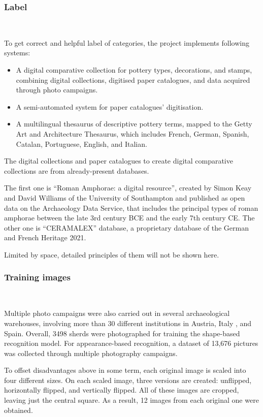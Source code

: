 \documentclass[journal]{IEEEtran}
\begin{document}
	\subsubsection{Label}
	\ 
	
	To get correct and helpful label of categories, the project implements following systems:
	
	\begin{itemize}
		\item A digital comparative collection for pottery types, decorations, and stamps, combining digital collections, digitised paper catalogues, and data acquired through photo campaigns.
		\item A semi-automated system for paper catalogues’ digitisation.
		\item A multilingual thesaurus of descriptive pottery terms, mapped to the Getty Art and Architecture Thesaurus, which includes French, German, Spanish, Catalan, Portuguese, English, and Italian.		
	\end{itemize}

	The digital collections and paper catalogues to create digital comparative collections are from already-present databases. 
	
	The first one is ``Roman Amphorae: a digital resource''\cite{Roman_Amphorae}, created by Simon Keay and David Williams of the University of Southampton and published as open data on the Archaeology Data Service, that includes the principal types of roman amphorae between the late 3rd century BCE and the early 7th century CE. The other one is “CERAMALEX” database\cite{CERAMALEX}, a proprietary database of the German and French Heritage 2021.

	Limited by space, detailed principles of them will not be shown here.

	\subsubsection{Training images}
	\ 
	
	Multiple photo campaigns were also carried out in several archaeological warehouses, involving more than 30 different institutions in Austria, Italy , and Spain. Overall, 3498 sherds were photographed for training the shape-based recognition model. For appearance-based recognition, a dataset of 13,676 pictures was collected through multiple photography campaigns.
	
	To offset disadvantages above in some term, each original image is scaled into four different sizes. On each scaled image, three versions are created: unflipped, horizontally flipped, and vertically flipped. All of these images are cropped, leaving just the central square. As a result, 12 images from each original one were obtained.
	
\end{document}
